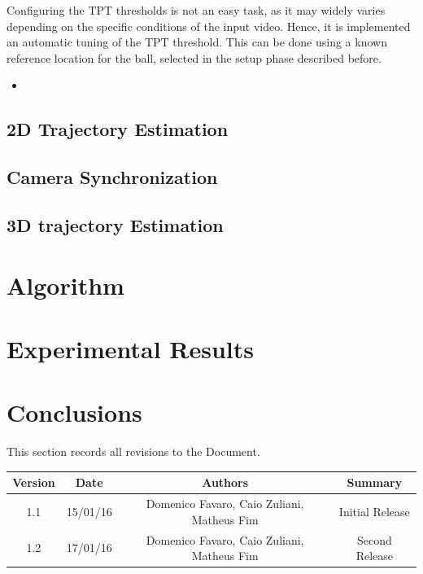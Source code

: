\documentclass[a4paper]{article}
\begin{document}
Configuring the TPT thresholds is not an easy task, as it may widely varies depending on the specific conditions of the input video. Hence, it is implemented an automatic tuning of the TPT threshold. This can be done using a known reference location for the ball, selected in the setup phase described before.
 
\begin{itemize}
	\item 

\end{itemize}

\subsection{2D Trajectory Estimation}
\subsection{Camera Synchronization}
\subsection{3D trajectory Estimation}

\section{Algorithm}
\section{Experimental Results}
\section{Conclusions}


This section records all revisions to the Document.
\newline \newline
\begin{tabular}{ | c | c | c | c | }
\hline
	Version & Date & Authors & Summary \\ \hline
	1.1 & 15/01/16 & Domenico Favaro, Caio Zuliani, Matheus Fim & Initial Release  \\ \hline
	1.2 & 17/01/16 & Domenico Favaro, Caio Zuliani, Matheus Fim & Second Release  \\ \hline
\end{tabular}
\end{document}
